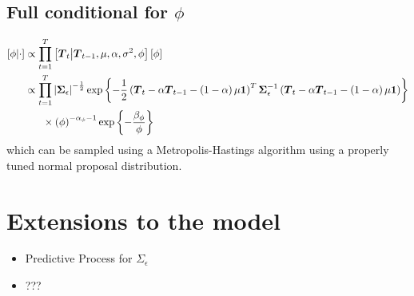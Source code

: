 \documentclass{article}\usepackage[]{graphicx}\usepackage[]{color}
\def\bm#1{\mbox{\boldmath $#1$}}
\begin{document}
\subsection{Full conditional for $\phi$}
%
\begin{align*}
%
\left[ \phi \middle| \cdot \right] & \propto \prod_{t = 1}^T \left[ \bm{T}_t \middle| \bm{T}_{t - 1}, \mu, \alpha, \sigma^2, \phi \right] \left[ \phi \right]\\
%
& \propto \prod_{t = 1}^T \left| \bm{\Sigma}_\epsilon \right|^{ - \frac{1} {2} } \exp{ \left\{ - \frac{1} {2} \left( \bm{T}_t  - \alpha \bm{T}_{t - 1} - \left( 1 - \alpha \right) \mu \bm{1} \right)^T \bm{\Sigma}_\epsilon^{ - 1} \left( \bm{T}_t  - \alpha \bm{T}_{t - 1} - \left( 1 - \alpha \right) \mu \bm{1} \right) \right\} }\\
& \hspace{6mm} \times \left( \phi \right)^{ - \alpha_\phi - 1} \exp{ \left\{ - \frac{\beta_\phi} {\phi} \right\} } \\
%
\end{align*}
%
which can be sampled using a Metropolis-Hastings algorithm using a properly tuned normal proposal distribution.\\
%
%
\section{Extensions to the model}
%
\begin{itemize}
%
\item Predictive Process for $\Sigma_\epsilon$
\item ???
%
\end{itemize}
% 
\end{document}

